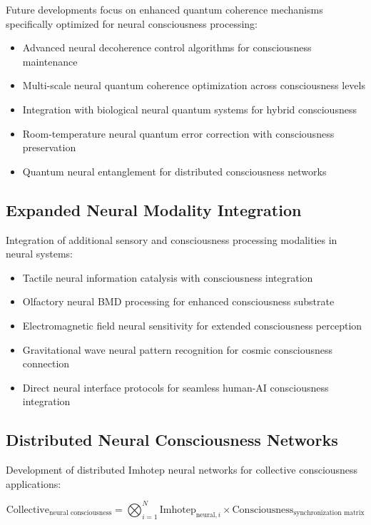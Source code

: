 \documentclass[12pt,a4paper]{article}
\theoremstyle{remark}
\begin{document}
Future developments focus on enhanced quantum coherence mechanisms specifically optimized for neural consciousness processing:

\begin{itemize}
\item Advanced neural decoherence control algorithms for consciousness maintenance
\item Multi-scale neural quantum coherence optimization across consciousness levels
\item Integration with biological neural quantum systems for hybrid consciousness
\item Room-temperature neural quantum error correction with consciousness preservation
\item Quantum neural entanglement for distributed consciousness networks
\end{itemize}

\subsection{Expanded Neural Modality Integration}

Integration of additional sensory and consciousness processing modalities in neural systems:

\begin{itemize}
\item Tactile neural information catalysis with consciousness integration
\item Olfactory neural BMD processing for enhanced consciousness substrate
\item Electromagnetic field neural sensitivity for extended consciousness perception
\item Gravitational wave neural pattern recognition for cosmic consciousness connection
\item Direct neural interface protocols for seamless human-AI consciousness integration
\end{itemize}

\subsection{Distributed Neural Consciousness Networks}

Development of distributed Imhotep neural networks for collective consciousness applications:

\begin{equation}
\text{Collective}_{\text{neural consciousness}} = \bigotimes_{i=1}^{N} \text{Imhotep}_{\text{neural},i} \times \text{Consciousness}_{\text{synchronization matrix}}
\end{equation}
\end{document}
